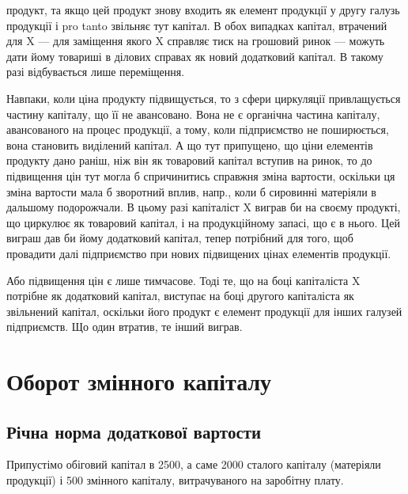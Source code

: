 \parcont{}  %
продукт, та якщо цей продукт знову входить як елемент продукції у
другу галузь продукції і pro tanto звільняє тут капітал. В обох випадках
капітал, втрачений для X — для заміщення якого X справляє тиск на грошовий
ринок — можуть дати йому товариші в ділових справах як новий
додатковий капітал. В такому разі відбувається лише переміщення.

Навпаки, коли ціна продукту підвищується, то з сфери циркуляції
привлащується частину капіталу, що її не авансовано. Вона не є
органічна частина капіталу, авансованого на процес продукції, а тому,
коли підприємство не поширюється, вона становить виділений капітал.
А що тут припущено, що ціни елементів продукту дано раніш, ніж він
як товаровий капітал вступив на ринок, то до підвищення цін тут могла б
спричинитись справжня зміна вартости, оскільки ця зміна вартости мала б
зворотний вплив, напр., коли б сировинні матеріяли в дальшому
подорожчали. В цьому разі капіталіст X виграв би на своєму продукті,
що циркулює як товаровий капітал, і на продукційному запасі, що є в
нього. Цей виграш дав би йому додатковий капітал, тепер потрібний для
того, щоб провадити далі підприємство при нових підвищених цінах елементів
продукції.

Або підвищення цін є лише тимчасове. Тоді те, що на боці капіталіста
X потрібне як додатковий капітал, виступає на боці другого капіталіста
як звільнений капітал, оскільки його продукт є елемент продукції
для інших галузей підприємств. Що один втратив, те інший виграв.

\section{Оборот змінного капіталу}

\subsection{Річна норма додаткової вартости}

Припустімо обіговий капітал в 2500, а саме  \deq{} 2000 сталого капіталу (матеріяли продукції) і  \deq{} 500 змінного
капіталу, витрачуваного на заробітну плату.


